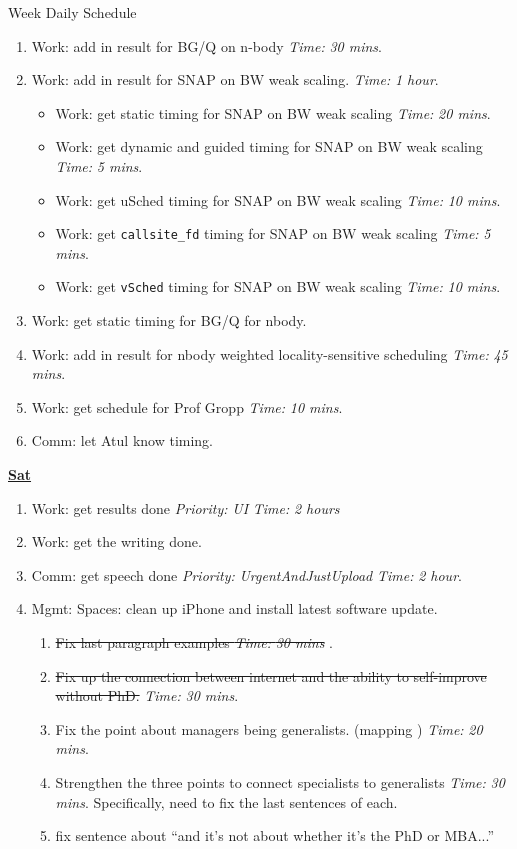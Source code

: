 \documentclass[serif, mathserif, final]{beamer}
\newcommand{\doneTask}[1]{\item \sout{#1}}
\newcommand{\timeEst}[1]{\textit{Time:} \textit{#1}}
\newcommand{\priority}[1]{\textit{Priority:} \textit{#1}}
\begin{document}
\begin{frame}{}
\begin{columns}
\begin{column}{0.50\linewidth}
\begin{block}{Week Daily Schedule}
\begin{enumerate}
\item \tiny Work: add in result for BG/Q on n-body \timeEst{30 mins}. 
\item \tiny Work: add in result for SNAP on BW  weak scaling. \timeEst{1 hour}. 
\begin{itemize} 
\item \tiny Work: get static timing for SNAP on BW weak scaling \timeEst{20 mins}.
\item \tiny Work: get dynamic and guided timing for SNAP on BW weak scaling \timeEst{5 mins}.
\item \tiny Work: get uSched timing for SNAP on BW weak scaling \timeEst{10 mins}. 
\item \tiny Work: get \texttt{callsite\_fd} timing for SNAP on BW weak scaling \timeEst{5 mins}.
\item \tiny Work: get \texttt{vSched} timing for SNAP on BW weak scaling \timeEst{10 mins}. 
\end{itemize} 

\item \tiny Work: get static timing for BG/Q for nbody. 

\item \tiny Work: add in result for nbody weighted locality-sensitive scheduling \timeEst{45 mins}. 

\item \tiny Work: get schedule for Prof Gropp \timeEst{10 mins}. 
\item \tiny Comm: let Atul know timing. 
\end{enumerate}

\textbf{\small \underline{Sat}} 
\begin{enumerate} 
\tiny \item \tiny Work: get results done \priority{UI} \timeEst{2 hours} 
\tiny \item \tiny Work: get the writing done. 
\item \tiny Comm: get speech done \priority{UrgentAndJustUpload} \timeEst{2 hour}.
\item \tiny Mgmt: Spaces: clean up iPhone and install latest software update. 

\begin{enumerate}
\tiny \doneTask{ Fix last paragraph examples \timeEst{30 mins} } . 
\doneTask{ Fix up the connection between internet and the ability to self-improve without PhD.}  \timeEst{30 mins}.  
\item \tiny Fix the point about managers being generalists. (mapping ) \timeEst{20 mins}. 
\item \tiny Strengthen the three points to connect specialists to generalists \timeEst{30 mins}.  Specifically, need to fix the last sentences of each. 
\item \tiny fix sentence about ``and it's not about whether it's the PhD or MBA...'' 


\end{enumerate}
\end{enumerate}
\end{block}
\end{column}
\end{columns}
\end{frame}
\end{document}
